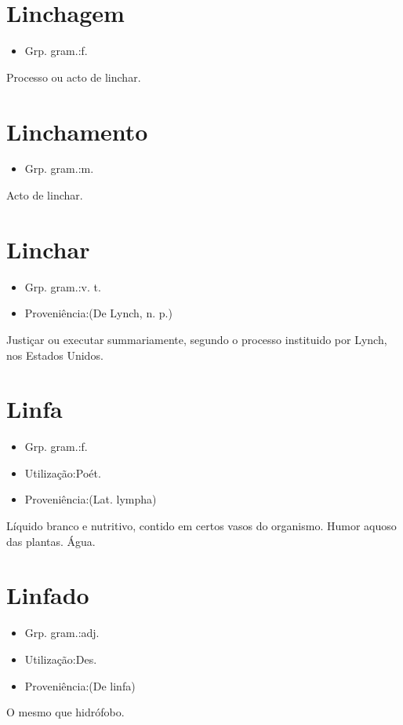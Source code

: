 \section{Linchagem}
\begin{itemize}
\item {Grp. gram.:f.}
\end{itemize}
Processo ou acto de linchar.
\section{Linchamento}
\begin{itemize}
\item {Grp. gram.:m.}
\end{itemize}
Acto de linchar.
\section{Linchar}
\begin{itemize}
\item {Grp. gram.:v. t.}
\end{itemize}
\begin{itemize}
\item {Proveniência:(De \textunderscore Lynch\textunderscore , n. p.)}
\end{itemize}
Justiçar ou executar summariamente, segundo o processo instituido por Lynch, nos Estados Unidos.
\section{Linfa}
\begin{itemize}
\item {Grp. gram.:f.}
\end{itemize}
\begin{itemize}
\item {Utilização:Poét.}
\end{itemize}
\begin{itemize}
\item {Proveniência:(Lat. \textunderscore lympha\textunderscore )}
\end{itemize}
Líquido branco e nutritivo, contido em certos vasos do organismo.
Humor aquoso das plantas.
Água.
\section{Linfado}
\begin{itemize}
\item {Grp. gram.:adj.}
\end{itemize}
\begin{itemize}
\item {Utilização:Des.}
\end{itemize}
\begin{itemize}
\item {Proveniência:(De \textunderscore linfa\textunderscore )}
\end{itemize}
O mesmo que \textunderscore hidrófobo\textunderscore .
